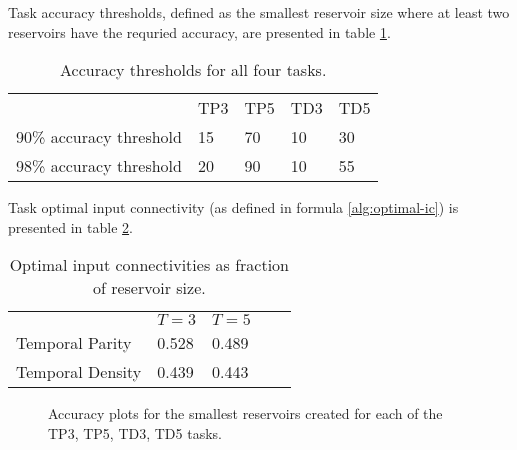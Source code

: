 Task accuracy thresholds,
defined as the smallest reservoir size where at least two reservoirs have the requried accuracy,
are presented in table \ref{tab:accuracy-thresholds}.

\begin{table}[ht]
    \centering
    \caption{Accuracy thresholds for all four tasks.}
    \label{tab:accuracy-thresholds}
    \begin{tabular}{lllll}
                     & TP3 & TP5 & TD3 & TD5 \\
    90\% accuracy threshold & 15  & 70  & 10  & 30  \\
    98\% accuracy threshold & 20  & 90 & 10  & 55
    \end{tabular}
\end{table}

Task optimal input connectivity (as defined in formula \ref{alg:optimal-ic}) is presented in table \ref{tab:optimal-ic}.

\begin{table}[h]
	\centering
	\caption{Optimal input connectivities as fraction of reservoir size.}
	\label{tab:optimal-ic}
	\begin{tabular}{lllll}
						 & $T=3$  & $T=5$ \\
        Temporal Parity  & 0.528          & 0.489         \\
        Temporal Density & 0.439          & 0.443
	\end{tabular}
\end{table}

\begin{figure}[ht]
    \centering
    \caption{Accuracy plots for the smallest reservoirs created for each of the TP3, TP5, TD3, TD5 tasks.}

    \label{fig:accuracy-min-size}
    \resizebox{\textwidth}{!}{
        \subfloat[TP3, N=10]{
            
        }
        \subfloat[TP5, N=10]{
            
        }
    }
    \resizebox{\textwidth}{!}{
        \subfloat[TD3, N=5]{
            
        }
        \subfloat[TD5, N=10]{
            
        }
    }
\end{figure}

